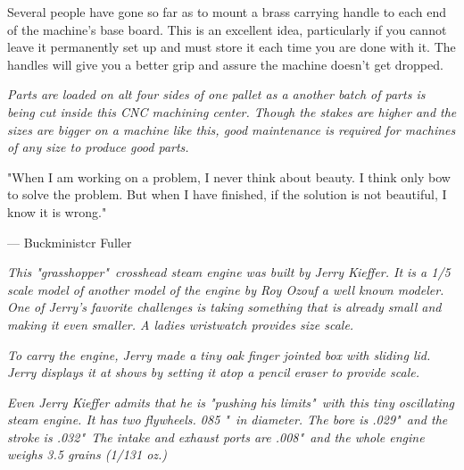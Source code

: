 Several people have gone so far as to mount a brass carrying handle to each end
of the machine's base board. This is an excellent idea, particularly if you
cannot leave it permanently set up and must store it each time you are done with
it. The handles will give you a better grip and assure the machine doesn't get
dropped.

\bigskip
\textit{Parts are loaded on alt four sides of one pallet as a another batch of
parts is being cut inside this CNC machining center. Though the stakes are
higher and the sizes are bigger on a machine like this, good maintenance is
required for machines of any size to produce good parts.}
\bigskip

"When I am working on a problem, I never think about beauty. I think only bow to
solve the problem. But when I have finished, if the solution is not beautiful, I
know it is wrong."

--- Buckministcr Fuller

\bigskip
\textit{This "grasshopper"\ crosshead steam engine was built by Jerry Kieffer.
It is a 1/5 scale model of another model of the engine by Roy Ozouf a well known
modeler. One of Jerry's favorite challenges is taking something that is already
small and making it even smaller. A ladies wristwatch provides size scale.}
\bigskip

\textit{To carry the engine, Jerry made a tiny oak finger jointed box with
sliding lid. Jerry displays it at shows by setting it atop a pencil eraser to
provide scale.}
\bigskip

\textit{Even Jerry Kieffer admits that he is "pushing his limits"\ with this tiny
oscillating steam engine. It has two flywheels. 085 "\ in diameter. The bore is
.029"\ and the stroke is .032"\ The intake and exhaust ports are .008"\ and the
whole engine weighs 3.5 grains (1/131 oz.)}
\bigskip

\secup

